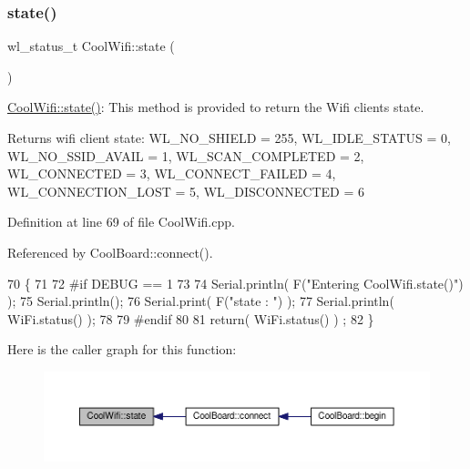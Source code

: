 \subsubsection{\texorpdfstring{state()}{state()}}
{\footnotesize\ttfamily wl\+\_\+status\+\_\+t Cool\+Wifi\+::state (\begin{DoxyParamCaption}{ }\end{DoxyParamCaption})}

\hyperlink{classCoolWifi_a1c7b4d82a4098d346e7593dce92039fa}{Cool\+Wifi\+::state()}\+: This method is provided to return the Wifi client\textquotesingle{}s state. \begin{DoxyReturn}{Returns}
wifi client state\+: W\+L\+\_\+\+N\+O\+\_\+\+S\+H\+I\+E\+LD = 255, W\+L\+\_\+\+I\+D\+L\+E\+\_\+\+S\+T\+A\+T\+US = 0, W\+L\+\_\+\+N\+O\+\_\+\+S\+S\+I\+D\+\_\+\+A\+V\+A\+IL = 1, W\+L\+\_\+\+S\+C\+A\+N\+\_\+\+C\+O\+M\+P\+L\+E\+T\+ED = 2, W\+L\+\_\+\+C\+O\+N\+N\+E\+C\+T\+ED = 3, W\+L\+\_\+\+C\+O\+N\+N\+E\+C\+T\+\_\+\+F\+A\+I\+L\+ED = 4, W\+L\+\_\+\+C\+O\+N\+N\+E\+C\+T\+I\+O\+N\+\_\+\+L\+O\+ST = 5, W\+L\+\_\+\+D\+I\+S\+C\+O\+N\+N\+E\+C\+T\+ED = 6 
\end{DoxyReturn}


Definition at line 69 of file Cool\+Wifi.\+cpp.



Referenced by Cool\+Board\+::connect().


\begin{DoxyCode}
70 \{
71 
72 \textcolor{preprocessor}{#if DEBUG == 1 }
73 
74     Serial.println( F(\textcolor{stringliteral}{"Entering CoolWifi.state()"}) );
75     Serial.println();   
76     Serial.print( F(\textcolor{stringliteral}{"state : "}) );
77     Serial.println( WiFi.status() );
78 
79 \textcolor{preprocessor}{#endif}
80     
81     \textcolor{keywordflow}{return}( WiFi.status() ) ;
82 \}
\end{DoxyCode}
Here is the caller graph for this function\+:\nopagebreak
\begin{figure}[H]
\begin{center}
\leavevmode
\includegraphics[width=350pt]{classCoolWifi_a1c7b4d82a4098d346e7593dce92039fa_icgraph}
\end{center}
\end{figure}


